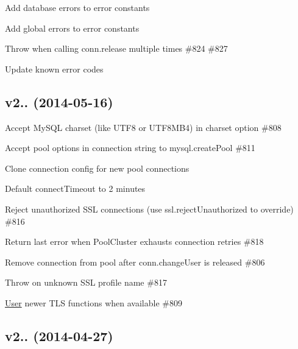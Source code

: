 \begin{DoxyItemize}
\item Add database errors to error constants
\item Add global errors to error constants
\item Throw when calling {\ttfamily conn.\+release} multiple times \#824 \#827
\item Update known error codes
\end{DoxyItemize}

\subsection*{v2.. (2014-\/05-\/16)}


\begin{DoxyItemize}
\item Accept My\+S\+Q\+L charset (like {\ttfamily U\+T\+F8} or {\ttfamily U\+T\+F8\+M\+B4}) in {\ttfamily charset} option \#808
\item Accept pool options in connection string to {\ttfamily mysql.\+create\+Pool} \#811
\item Clone connection config for new pool connections
\item Default {\ttfamily connect\+Timeout} to 2 minutes
\item Reject unauthorized S\+S\+L connections (use {\ttfamily ssl.\+reject\+Unauthorized} to override) \#816
\item Return last error when Pool\+Cluster exhausts connection retries \#818
\item Remove connection from pool after {\ttfamily conn.\+change\+User} is released \#806
\item Throw on unknown S\+S\+L profile name \#817
\item \hyperlink{class_user}{User} newer T\+L\+S functions when available \#809
\end{DoxyItemize}

\subsection*{v2.. (2014-\/04-\/27)}



